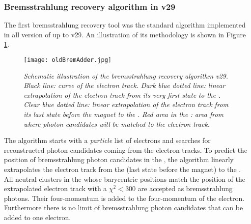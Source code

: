 \subsubsection{Bremsstrahlung recovery algorithm in \davinci v29 }
\label{sub:oldBrem}
The first bremsstrahlung recovery tool was the standard algorithm implemented in all version of \davinci up to v29. An illustration of its methodology is shown in Figure \ref{fig:oldBremAdd}.
\begin{figure}[ht]
\vspace*{-0.5cm}
  \begin{center}
  \texttt{[image: oldBremAdder.jpg]}
  \end{center}
  \vspace*{-0.5cm}
  \caption{\textit{Schematic illustration of the bremsstrahlung recovery algorithm \davinci v29. Black line: curve of the electron track. Dark blue dotted line: linear extrapolation of the electron track from its very first state to the \ecal. Clear blue dotted line: linear extrapolation of the electron track from its last state before the magnet to the \ecal. Red area in the \ecal: area from where photon candidates will be matched to the electron track.}}
  \label{fig:oldBremAdd}
\end{figure}
The algorithm starts with a \textit{particle} list of electrons and searches for reconstructed photon candidates coming from the electron tracks.
To predict the position of bremsstrahlung photon candidates in the \ecal, the algorithm linearly extrapolates the electron track from the \ttracker (last state before the magnet) to the \ecal. All neutral clusters in the \ecal whose barycentric positions match the position of the extrapolated electron track with a $\chi^2 < 300$ are accepted as bremsstrahlung photons. Their four-momentum is added to the four-momentum of the electron. Furthermore there is no limit of bremsstrahlung photon candidates that can be added to one electron.\\


